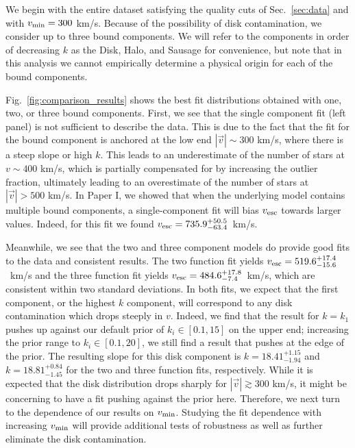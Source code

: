 \documentclass[twocolumn,preprintnumbers]{aastex63}
\DeclareRobustCommand{\Sec}[1]{Sec.~\ref{#1}}
\DeclareRobustCommand{\Fig}[1]{Fig.~\ref{#1}}
\newcommand{\vesc}{v_{\rm esc}}
\newcommand{\vmin}{v_{\rm min}}
\newcommand{\speed}{|\vec{v}|}
\begin{document}
We begin with the entire dataset satisfying the quality cuts of \Sec{sec:data} and with $\vmin = 300$ km/s. Because of the possibility of disk contamination, we consider up to three bound components. We will refer to the components in order of decreasing $k$ as the Disk, Halo, and Sausage for convenience, but note that in this analysis we cannot empirically determine a physical origin for each of the bound components. 

\Fig{fig:comparison_results} shows the best fit distributions obtained with one, two, or three bound components. First, we see that the single component fit (left panel) is not sufficient to describe the data. 
This is due to the fact that the fit for the bound component is anchored at the low end $|\vec{v}| \sim 300$ km/s, where there is a steep slope or high $k$. This leads to an underestimate of the number of stars at $v \sim 400$ km/s, which is partially compensated for by increasing the outlier fraction, ultimately leading to an overestimate of the number of stars at $\speed > 500$ km/s. In Paper I, we showed that when the underlying model contains multiple bound components, a single-component fit will bias $\vesc$ towards larger values.  Indeed, for this fit we found $\vesc = 735.9^{+50.5}_{-63.4}$~km/s.  

Meanwhile, we see that the two and three component models do provide good fits to the data and consistent results. The two function fit yields $\vesc = 519.6^{+17.4}_{-15.6}$~km/s and the three function fit yields $\vesc = 484.6^{+17.8}_{-7.4}$~km/s, which are consistent within two standard deviations. In both fits, we expect that the first component, or the highest $k$ component, will correspond to any disk contamination which drops steeply in $v$. Indeed, we find that the result for $k = k_{1}$ pushes up against our default prior of $k_{i} \in[0.1, 15]$ on the upper end; increasing the prior range to $k_{i} \in [0.1, 20]$, we still find a result that pushes at the edge of the prior. The resulting slope for this disk component is $k = 18.41^{+1.15}_{-1.94}$ and $k= 18.81^{+0.84}_{-1.45}$ for the two and three function fits, respectively. While it is expected that the disk distribution drops sharply for $\speed \gtrsim 300$ km/s, it might be concerning to have a fit pushing against the prior here. Therefore, we next turn to the dependence of our results on $\vmin$. Studying the fit dependence with increasing $\vmin$ will provide additional tests of robustness as well as  further eliminate the disk contamination. 
\end{document}
